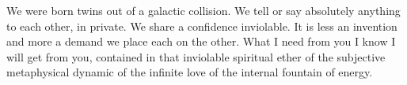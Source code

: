 

﻿We were born twins out of a galactic collision.  We tell or say absolutely anything to each other, in private.  We share a confidence inviolable.  It is less an invention and more a demand we place each on the other.  What I need from you I know I will get from you, contained in that inviolable spiritual ether of the subjective metaphysical dynamic of the infinite love of the internal fountain of energy.
\bye
